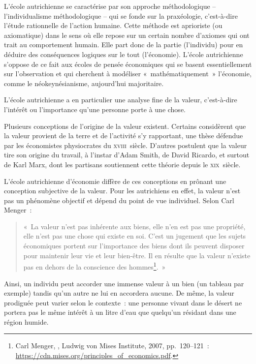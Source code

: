 L'école autrichienne se caractérise par son approche méthodologique -- l'individualisme méthodologique -- qui se fonde sur la praxéologie, c'est-à-dire l'étude rationnelle de l'action humaine. Cette méthode est aprioriste (ou axiomatique) dans le sens où elle repose sur un certain nombre d'axiomes qui ont trait au comportement humain. Elle part donc de la partie (l'individu) pour en déduire des conséquences logiques sur le tout (l'économie). L'école autrichienne s'oppose de ce fait aux écoles de pensée économiques qui se basent essentiellement sur l'observation et qui cherchent à modéliser «~mathématiquement~» l'économie, comme le néokeynésianisme, aujourd'hui majoritaire.


L'école autrichienne a en particulier une analyse fine de la valeur, c'est-à-dire l'intérêt ou l'importance qu'une personne porte à une chose.

Plusieurs conceptions de l'origine de la valeur existent. Certains considèrent que la valeur provient de la terre et de l'activité s'y rapportant, une thèse défendue par les économistes physiocrates du \textsc{xviii}\ieme{}~siècle. D'autres postulent que la valeur tire son origine du travail, à l'instar d'Adam Smith, de David Ricardo, et surtout de Karl Marx, dont les partisans soutiennent cette théorie depuis le \textsc{xix}\ieme{}~siècle.

L'école autrichienne d'économie diffère de ces conceptions en prônant une conception subjective de la valeur. Pour les autrichiens en effet, la valeur n'est pas un phénomène objectif et dépend du point de vue individuel. Selon Carl Menger~: 

\vspace{-1em}
\begin{quote}
«~La valeur n'est pas inhérente aux biens, elle n'en est pas une propriété, elle n'est pas une chose qui existe en soi. C'est un jugement que les sujets économiques portent sur l'importance des biens dont ils peuvent disposer pour maintenir leur vie et leur bien-être. Il en résulte que la valeur n'existe pas en dehors de la conscience des hommes\footnote{Carl Menger, , Ludwig von Mises Institute, 2007, pp.~120--121~: \url{https://cdn.mises.org/principles_of_economics.pdf}.}.~»
\end{quote}

Ainsi, un individu peut accorder une immense valeur à un bien (un tableau par exemple) tandis qu'un autre ne lui en accordera aucune. De même, la valeur prodiguée peut varier selon le contexte~: une personne vivant dans le désert ne portera pas le même intérêt à un litre d'eau que quelqu'un résidant dans une région humide.

